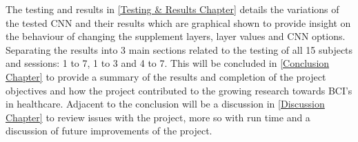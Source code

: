 The testing and results in \cref{Testing & Results Chapter} details the variations of the tested CNN and their results which are graphical shown to provide insight on the behaviour of changing the supplement layers, layer values and CNN options. Separating the results into 3 main sections related to the testing of all 15 subjects and sessions: 1 to 7, 1 to 3 and 4 to 7. This will be concluded in \cref{Conclusion Chapter} to provide a summary of the results and completion of the project objectives and how the project contributed to the growing research towards BCI's in healthcare. Adjacent to the conclusion will be a discussion in \cref{Discussion Chapter} to review issues with the project, more so with run time and a discussion of future improvements of the project.